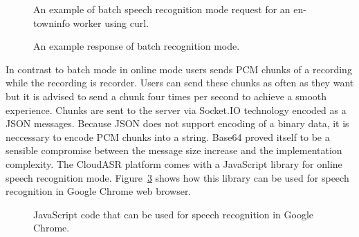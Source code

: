 \begin{figure}[h]
  

  \caption{An example of batch speech recognition mode request for an en-towninfo worker using curl.}
  \label{fig:curl}
\end{figure}

\begin{figure}[h]
  

  \caption{An example response of batch recognition mode.}
  \label{fig:curl-response}
\end{figure}

In contrast to batch mode in online mode users sends PCM chunks of a recording while the recording is recorder.
Users can send these chunks as often as they want
  but it is advised to send a chunk four times per second
  to achieve a smooth experience.
Chunks are sent to the server via Socket.IO technology encoded as a JSON messages.
Because JSON does not support encoding of a binary data,
  it is neccessary to encode PCM chunks into a string.
Base64 proved itself to be a sensible compromise between the message size increase
  and the implementation complexity.
The CloudASR platform comes with a JavaScript library for online speech recognition mode.
Figure~\ref{fig:online} shows how this library can be used for speech recognition in Google Chrome web browser.

\begin{figure}[T]
  

  \caption{JavaScript code that can be used for speech recognition in Google Chrome.}
  \label{fig:online}
  \vspace*{6in}
\end{figure}
